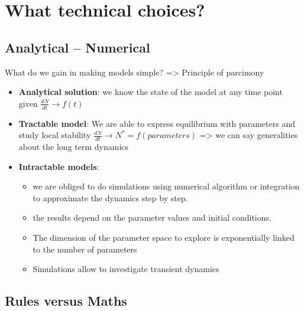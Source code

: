 \documentclass[
]{book}
\providecommand{\tightlist}{%
  \setlength{\itemsep}{0pt}\setlength{\parskip}{0pt}}
\theoremstyle{definition}
\theoremstyle{definition}
\theoremstyle{definition}
\theoremstyle{definition}
\theoremstyle{remark}
\begin{document}
\section{What technical choices?}\label{what-technical-choices}

\subsection{Analytical -- Numerical}\label{analytical-numerical}

What do we gain in making models simple? =\textgreater{} Principle of parcimony

\begin{itemize}
\tightlist
\item
  \textbf{Analytical solution}: we know the state of the model at any time point given \(\frac{dN}{dt} \rightarrow f(t)\)
\item
  \textbf{Tractable model}: We are able to express equilibrium with parameters and study local stability \(\frac{dN}{dt} \rightarrow N^*=f(parameters)\) =\textgreater{} we can say generalities about the long term dynamics
\item
  \textbf{Intractable models}:

  \begin{itemize}
  \tightlist
  \item
    we are obliged to do simulations using numerical algorithm or integration to approximate the dynamics step by step.
  \item
    the results depend on the parameter values and initial conditions.
  \item
    The dimension of the parameter space to explore is exponentially linked to the number of parameters
  \item
    Simulations allow to investigate transient dynamics
  \end{itemize}
\end{itemize}

\subsection{Rules versus Maths}\label{rules-versus-maths}
\end{document}
